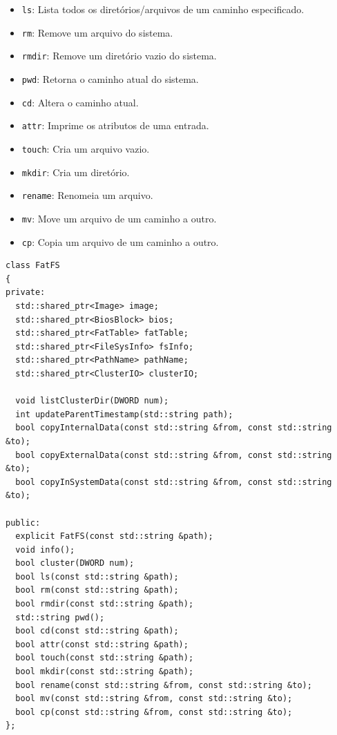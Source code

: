 \documentclass[
    12pt,				%
    oneside,   	        %
    a4paper,			%
    english,			%
    french,				%
    spanish,			%
    brazil,				%
    ]{pacotes/abntex2}
\begin{document}
\begin{itemize}
\begin{itemize}
            \item \texttt{ls}: Lista todos os diretórios/arquivos de um caminho especificado.
            \item \texttt{rm}: Remove um arquivo do sistema.
            \item \texttt{rmdir}: Remove um diretório vazio do sistema.
            \item \texttt{pwd}: Retorna o caminho atual do sistema.
            \item \texttt{cd}: Altera o caminho atual.
            \item \texttt{attr}: Imprime os atributos de uma entrada.
            \item \texttt{touch}: Cria um arquivo vazio.
            \item \texttt{mkdir}: Cria um diretório.
            \item \texttt{rename}: Renomeia um arquivo.
            \item \texttt{mv}: Move um arquivo de um caminho a outro.
            \item \texttt{cp}: Copia um arquivo de um caminho a outro.
        \end{itemize}
\end{itemize}

\begin{lstlisting}[caption={Classe para manipulação do sistema de arquivos FAT}, label={lst:fatfs}]
class FatFS
{
private:
  std::shared_ptr<Image> image;
  std::shared_ptr<BiosBlock> bios;
  std::shared_ptr<FatTable> fatTable;
  std::shared_ptr<FileSysInfo> fsInfo;
  std::shared_ptr<PathName> pathName;
  std::shared_ptr<ClusterIO> clusterIO;

  void listClusterDir(DWORD num);
  int updateParentTimestamp(std::string path);
  bool copyInternalData(const std::string &from, const std::string &to);
  bool copyExternalData(const std::string &from, const std::string &to);
  bool copyInSystemData(const std::string &from, const std::string &to);

public:
  explicit FatFS(const std::string &path);
  void info();
  bool cluster(DWORD num);
  bool ls(const std::string &path);
  bool rm(const std::string &path);
  bool rmdir(const std::string &path);
  std::string pwd();
  bool cd(const std::string &path);
  bool attr(const std::string &path);
  bool touch(const std::string &path);
  bool mkdir(const std::string &path);
  bool rename(const std::string &from, const std::string &to);
  bool mv(const std::string &from, const std::string &to);
  bool cp(const std::string &from, const std::string &to);
};
\end{lstlisting}
\end{document}
